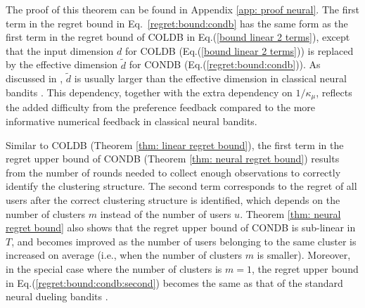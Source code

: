 The proof of this theorem can be found in Appendix \ref{app: proof neural}.
The first term in the regret bound in Eq.~\ref{regret:bound:condb} has the same form as the first term in the regret bound of COLDB in Eq.(\ref{bound linear 2 terms}), except that the input dimension $d$ for COLDB (Eq.(\ref{bound linear 2 terms})) is replaced by the effective dimension $\widetilde{d}$ for CONDB (Eq.(\ref{regret:bound:condb})).
As discussed in \citet{verma2024neural}, $\widetilde{d}$ is usually larger than the effective dimension in classical neural bandits \cite{zhou2020neural,zhang2020neural}.
This dependency, together with the extra dependency on $1/\kappa_\mu$, reflects the added difficulty from the preference feedback compared to the more informative numerical feedback in classical neural bandits.

Similar to COLDB (Theorem \ref{thm: linear regret bound}), the first term in the regret upper bound of CONDB (Theorem \ref{thm: neural regret bound}) results from the number of rounds needed to collect enough observations to correctly identify the clustering structure. The second term corresponds to the regret of all users after the correct clustering structure is identified, which depends on the number of clusters $m$ instead of the number of users $u$.
Theorem \ref{thm: neural regret bound} also shows that the regret upper bound of CONDB is sub-linear in $T$, and becomes improved as the number of users belonging to the same cluster is increased on average (i.e., when the number of clusters $m$ is smaller).
Moreover, in the special case where the number of clusters is $m=1$, the regret upper bound in Eq.(\ref{regret:bound:condb:second}) becomes the same as that of the standard neural dueling bandits \cite{verma2024neural}.
